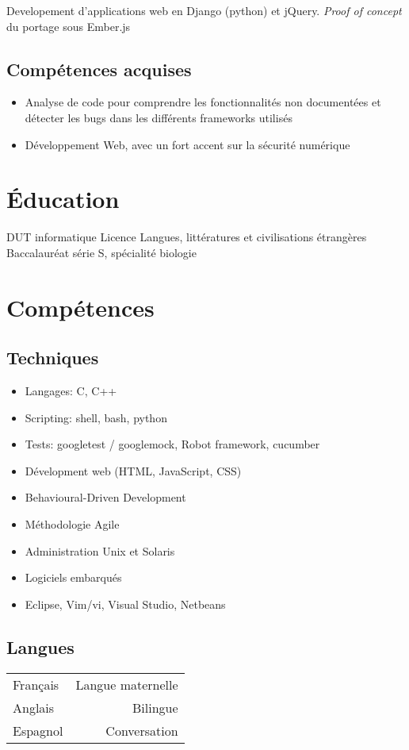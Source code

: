 \documentclass{cv}
\begin{document}
{Developement d'applications web en Django (python) et jQuery. \textit{Proof of concept} du portage sous Ember.js}
\subsection{Compétences acquises}
\begin{itemize}
    \item {Analyse de code pour comprendre les fonctionnalités non documentées et détecter les bugs dans les différents frameworks utilisés}
    \item {Développement Web, avec un fort accent sur la sécurité numérique}
\end{itemize}

\pagebreak
\section{Éducation}
{DUT informatique}
{Licence Langues, littératures et civilisations étrangères }
{Baccalauréat série S, spécialité biologie}

\section{Compétences}
\subsection{Techniques}
\begin{itemize}
    \item {Langages: C, C++}
    \item {Scripting: shell, bash, python}
    \item {Tests: googletest / googlemock, Robot framework, cucumber}
    \item {Dévelopment web (HTML, JavaScript, CSS)}
    \item {Behavioural-Driven Development}
    \item {Méthodologie Agile}
    \item {Administration Unix et Solaris}
    \item {Logiciels embarqués}
    \item {Eclipse, Vim/vi, Visual Studio, Netbeans}
\end{itemize}

\subsection{Langues}
\begin{tabular}{L!{\VRule}R}
Français&Langue maternelle\\
Anglais&Bilingue\\
Espagnol&Conversation\\
\end{tabular}
\end{document}
